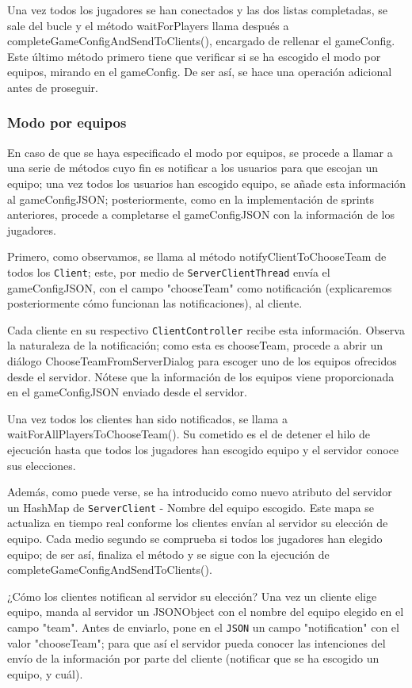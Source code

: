 \documentclass[12pt,a4paper,openright]{book}
\theoremstyle{break}
\begin{document}
Una vez todos los jugadores se han conectados y las dos listas completadas, se sale del bucle y el método waitForPlayers llama después a completeGameConfigAndSendToClients(), encargado de rellenar el gameConfig. Este último método primero tiene que verificar si se ha escogido el modo por equipos, mirando en el gameConfig. De ser así, se hace una operación adicional antes de proseguir.

\subsubsection{Modo por equipos}

En caso de que se haya especificado el modo por equipos, se procede a llamar a una serie de métodos cuyo fin es notificar a los usuarios para que escojan un equipo; una vez todos los usuarios han escogido equipo, se añade esta información al gameConfigJSON; posteriormente, como en la implementación de sprints anteriores, procede a completarse el gameConfigJSON con la información de los jugadores.

Primero, como observamos, se llama al método notifyClientToChooseTeam de todos los \texttt{Client}; este, por medio de \texttt{ServerClientThread} envía el gameConfigJSON, con el campo "chooseTeam" como notificación (explicaremos posteriormente cómo funcionan las notificaciones), al cliente.

Cada cliente en su respectivo \texttt{ClientController} recibe esta información. Observa la naturaleza de la notificación; como esta es chooseTeam, procede a abrir un diálogo ChooseTeamFromServerDialog para escoger uno de los equipos ofrecidos desde el servidor. Nótese que la información de los equipos viene proporcionada en el gameConfigJSON enviado desde el servidor.

Una vez todos los clientes han sido notificados, se llama a waitForAllPlayersToChooseTeam(). Su cometido es el de detener el hilo de ejecución hasta que todos los jugadores han escogido equipo y el servidor conoce sus elecciones.

Además, como puede verse, se ha introducido como nuevo atributo del servidor un HashMap de \texttt{ServerClient} - Nombre del equipo escogido. Este mapa se actualiza en tiempo real conforme los clientes envían al servidor su elección de equipo. Cada medio segundo se comprueba si todos los jugadores han elegido equipo; de ser así, finaliza el método y se sigue con la ejecución de completeGameConfigAndSendToClients().

¿Cómo los clientes notifican al servidor su elección? Una vez un cliente elige equipo, manda al servidor un JSONObject con el nombre del equipo elegido en el campo "team". Antes de enviarlo, pone en el \texttt{JSON} un campo "notification" con el valor "chooseTeam"; para que así el servidor pueda conocer las intenciones del envío de la información por parte del cliente (notificar que se ha escogido un equipo, y cuál).
\end{document}

